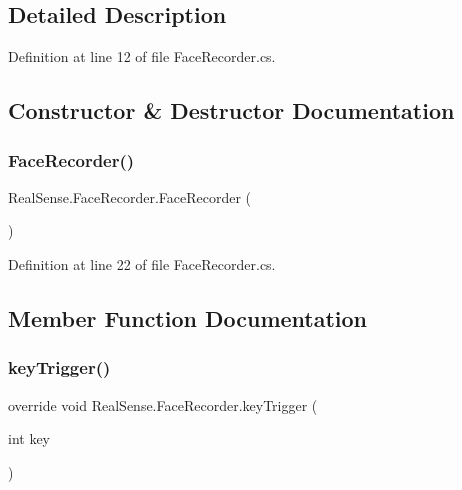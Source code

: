 \subsection{Detailed Description}


Definition at line 12 of file Face\+Recorder.\+cs.



\subsection{Constructor \& Destructor Documentation}
\mbox{\label{class_real_sense_1_1_face_recorder_a782589b2a536a93d548f1efab49c6bcd}} 
\subsubsection{\texorpdfstring{Face\+Recorder()}{FaceRecorder()}}
{\footnotesize\ttfamily Real\+Sense.\+Face\+Recorder.\+Face\+Recorder (\begin{DoxyParamCaption}{ }\end{DoxyParamCaption})}



Definition at line 22 of file Face\+Recorder.\+cs.



\subsection{Member Function Documentation}
\mbox{\label{class_real_sense_1_1_face_recorder_aedf8a394ed84e2e4c3d82d050e457542}} 
\subsubsection{\texorpdfstring{key\+Trigger()}{keyTrigger()}}
{\footnotesize\ttfamily override void Real\+Sense.\+Face\+Recorder.\+key\+Trigger (\begin{DoxyParamCaption}\item[{int}]{key }\end{DoxyParamCaption})\hspace{0.3cm}{\ttfamily [virtual]}}

